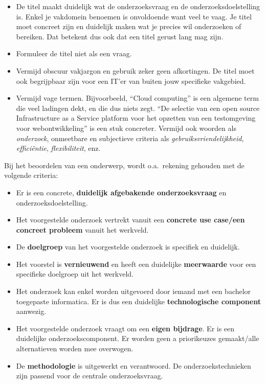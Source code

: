 \begin{itemize}
  \item De titel maakt duidelijk wat de onderzoeksvraag en de onderzoeksdoelstelling is. Enkel je vakdomein benoemen is onvoldoende want veel te vaag. Je titel moet concreet zijn en duidelijk maken wat je precies wil onderzoeken of bereiken. Dat betekent dus ook dat een titel gerust lang mag zijn.
  \item Formuleer de titel niet als een vraag.
  \item Vermijd obscuur vakjargon en gebruik zeker geen afkortingen. De titel moet ook begrijpbaar zijn voor een IT'er van buiten jouw specifieke vakgebied.
  \item Vermijd vage termen. Bijvoorbeeld, ``Cloud computing'' is een algemene term die veel ladingen dekt, en die dus niets zegt. ``De selectie van een open source Infrastructure as a Service platform voor het opzetten van een testomgeving voor webontwikkeling'' is een stuk concreter. Vermijd ook woorden als \emph{onderzoek}, onmeetbare en subjectieve criteria als \emph{gebruiksvriendelijkheid}, \emph{efficiëntie}, \emph{flexibiliteit}, enz.
\end{itemize}

Bij het beoordelen van een onderwerp, wordt o.a.\ rekening gehouden met de volgende criteria:

\begin{itemize}
  \item Er is een concrete, \textbf{duidelijk afgebakende onderzoeksvraag} en onderzoeksdoelstelling.
  \item Het voorgestelde onderzoek vertrekt vanuit een \textbf{concrete use case/een concreet probleem} vanuit het werkveld. 
  \item De \textbf{doelgroep} van het voorgestelde onderzoek is specifiek en duidelijk. 
  \item Het voorstel is \textbf{vernieuwend} en heeft een duidelijke \textbf{meerwaarde} voor een specifieke doelgroep uit het werkveld.
  \item Het onderzoek kan enkel worden uitgevoerd door iemand met een bachelor toegepaste informatica. Er is dus een duidelijke \textbf{technologische component} aanwezig.
  \item Het voorgestelde onderzoek vraagt om een \textbf{eigen bijdrage}. Er is een duidelijke onderzoekscomponent. Er worden geen a priorikeuzes gemaakt/alle alternatieven worden mee overwogen. 
  \item De \textbf{methodologie} is uitgewerkt en verantwoord. De onderzoekstechnieken zijn passend voor de centrale onderzoeksvraag. 
\end{itemize}

